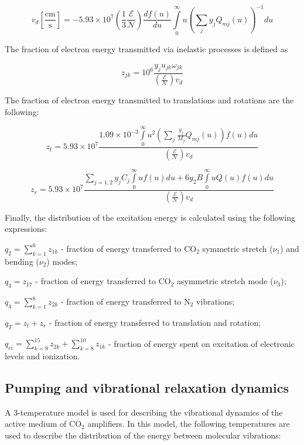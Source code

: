 \documentclass{report}
\begin{document}
\begin{equation}\label{eq:v_d}
v_d \left[ \frac{\text{cm}}{\text{s}} \right] =  - 5.93 \times 10^7 \left( \frac{1}{3}\frac{\mathcal{E}}{\mathcal{N}} \right)\frac{df(u)}{du} \int\limits_0^\infty u \left( \sum\limits_j y_j Q_{mj}(u) \right)^{-1} du
\end{equation}

The fraction of electron energy transmitted via inelastic processes is defined as

\begin{equation}\label{eq:z_jk}
z_{jk} = 10^6 \frac{y_j u_{jk} \omega _{jk}} {\left( \frac{\mathcal{E}}{\mathcal{N}} \right) v_d}   
\end{equation}

The fraction of electron energy transmitted to translations and rotations are the following:

\begin{equation}\label{eq:z_t}
z_t = 5.93 \times 10^7 \frac{1.09 \times 10^{-3} \int\limits_0^\infty u^2 \left( \sum\limits_j \frac{y_j}{M_j} Q_{mj}(u) \right)f(u)du} {\left( \frac{\mathcal{E}}{\mathcal{N}} \right) v_d}
\end{equation}

\begin{equation}\label{eq:z_r}
z_r = 5.93 \times 10^7 \frac{\sum\limits_{j=1,2} y_j C_j \int\limits_0^\infty uf(u)du + 6 y_2 B \int\limits_0^\infty u Q(u) f(u) du} {\left( \frac{\mathcal{E}}{\mathcal{N}} \right) v_d} 
\end{equation}

Finally, the distribution of the excitation energy is calculated using the following expressions:

$q_2 = \sum\limits_{k=1}^6 z_{1k}$ - fraction of energy transferred to {CO$_2$} symmetric stretch ($\nu_1$) and bending ($\nu_2$) modes;

$q_3 = z_{17}$ - fraction of energy transferred to {CO$_2$} asymmetric stretch mode ($\nu_3$);

$q_4 = \sum\limits_{k=1}^8 z_{2k}$ - fraction of energy transferred to {N$_2$} vibrations;

$q_T = z_t + z_r$ - fraction of energy transferred to translation and rotation;

$q_{ei} = \sum\limits_{k=9}^{15} z_{2k}  + \sum\limits_{k=8}^{10} z_{1k}$ - fraction of energy spent on excitation of electronic levels and ionization.



\subsection{Pumping and vibrational relaxation dynamics}
A 3-temperature model is used for describing the vibrational dynamics of the active medium of {CO$_2$} amplifiers. In this model, the following temperatures are used to describe the distribution of the energy between molecular vibrations:
\end{document}

